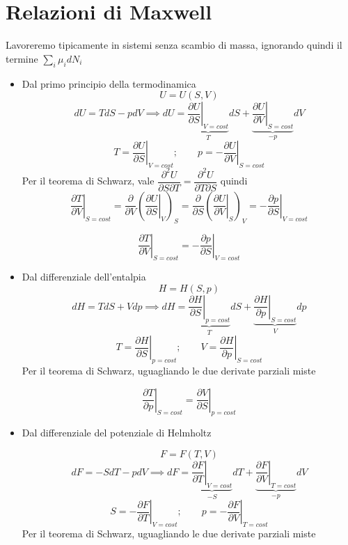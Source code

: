 \documentclass[a4paper,11pt]{report}
\begin{document}
	\section{Relazioni di Maxwell}
		Lavoreremo tipicamente in sistemi senza scambio di massa, ignorando quindi il termine $\sum_i \mu_i dN_i$
		\begin{itemize}
		\item Dal primo principio della termodinamica
		$$
		U=U(S,V)
		$$
		$$
		dU = TdS - pdV \implies dU =\underset{T}{ \underbrace{\left.\dfrac{\partial U}{\partial S}\right|_{V=cost}}}dS +  \underset{-p}{\underbrace{\left.\dfrac{\partial U}{\partial V}\right|_{S=cost}}}dV
		$$
		$$
		T= \left.\dfrac{\partial U}{\partial S}\right|_{V=cost}; \qquad p= -  \left.\dfrac{\partial U}{\partial V}\right|_{S=cost}
		$$
		Per il teorema di Schwarz, vale $\dfrac{\partial^2 U}{\partial S\partial T} = \dfrac{\partial^2 U}{\partial T \partial S} $ quindi
		$$
		\left.\dfrac{\partial T}{\partial V}\right|_{S=cost} = \dfrac{\partial}{\partial V}\left( \left.\dfrac{\partial U}{\partial S}\right|_V \right)_S = 
		\dfrac{\partial}{\partial S}\left( \left.\dfrac{\partial U}{\partial V} \right|_S \right)_V = - \left.\dfrac{\partial p}{\partial S}\right|_{V=cost}
		$$
		
		\begin{equation}
			\left.\dfrac{\partial T}{\partial V}\right|_{S=cost} = - \left.\dfrac{\partial p}{\partial S}\right|_{V=cost}
		\end{equation}
		
		\item Dal differenziale dell'entalpia
		$$
		H=H(S,p)
		$$
		$$
		dH = TdS + Vdp \implies dH =\underset{T}{ \underbrace{\left.\dfrac{\partial H}{\partial S}\right|_{p=cost}}}dS +  \underset{V}{\underbrace{\left.\dfrac{\partial H}{\partial p}\right|_{S=cost}}}dp
		$$
		$$
		T= \left.\dfrac{\partial H}{\partial S}\right|_{p=cost}; \qquad V= \left.\dfrac{\partial H}{\partial p}\right|_{S=cost}
		$$
		Per il teorema di Schwarz, uguagliando le due derivate parziali miste

		
		\begin{equation}
		\left.\dfrac{\partial T}{\partial p}\right|_{S=cost} = \left.\dfrac{\partial V}{\partial S}\right|_{p=cost}
		\end{equation}
		
		\item Dal differenziale del potenziale di Helmholtz
		
		$$
		F=F(T,V)
		$$
		$$
		dF = - SdT - pdV \implies dF =\underset{-S}{ \underbrace{\left.\dfrac{\partial F}{\partial T}\right|_{V=cost}}}dT +  \underset{-p}{\underbrace{\left.\dfrac{\partial F}{\partial V}\right|_{T=cost}}}dV
		$$
		$$
		S = -\left.\dfrac{\partial F}{\partial T}\right|_{V=cost}; 
		\qquad
		p = - \left.\dfrac{\partial F}{\partial V}\right|_{T=cost}
		$$
		Per il teorema di Schwarz, uguagliando le due derivate parziali miste
		

\end{itemize}
\end{document}
